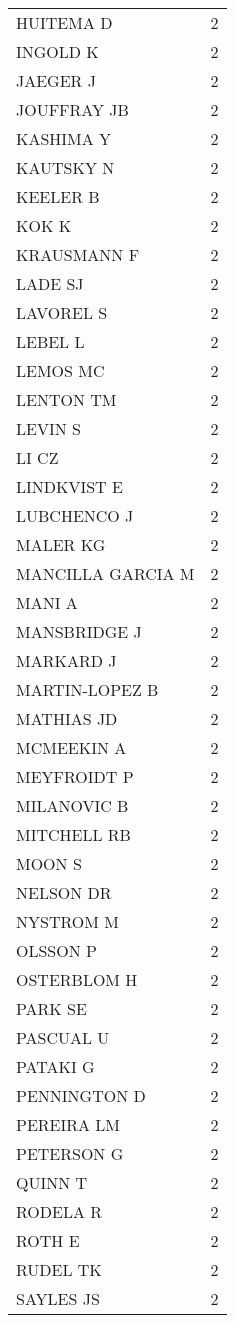 \documentclass[]{article}
\begin{document}
\begin{longtable}{lc}
HUITEMA D & 2 \\ 
INGOLD K & 2 \\ 
JAEGER J & 2 \\ 
JOUFFRAY JB & 2 \\ 
KASHIMA Y & 2 \\ 
KAUTSKY N & 2 \\ 
KEELER B & 2 \\ 
KOK K & 2 \\ 
KRAUSMANN F & 2 \\ 
LADE SJ & 2 \\ 
LAVOREL S & 2 \\ 
LEBEL L & 2 \\ 
LEMOS MC & 2 \\ 
LENTON TM & 2 \\ 
LEVIN S & 2 \\ 
LI CZ & 2 \\ 
LINDKVIST E & 2 \\ 
LUBCHENCO J & 2 \\ 
MALER KG & 2 \\ 
MANCILLA GARCIA M & 2 \\ 
MANI A & 2 \\ 
MANSBRIDGE J & 2 \\ 
MARKARD J & 2 \\ 
MARTIN-LOPEZ B & 2 \\ 
MATHIAS JD & 2 \\ 
MCMEEKIN A & 2 \\ 
MEYFROIDT P & 2 \\ 
MILANOVIC B & 2 \\ 
MITCHELL RB & 2 \\ 
MOON S & 2 \\ 
NELSON DR & 2 \\ 
NYSTROM M & 2 \\ 
OLSSON P & 2 \\ 
OSTERBLOM H & 2 \\ 
PARK SE & 2 \\ 
PASCUAL U & 2 \\ 
PATAKI G & 2 \\ 
PENNINGTON D & 2 \\ 
PEREIRA LM & 2 \\ 
PETERSON G & 2 \\ 
QUINN T & 2 \\ 
RODELA R & 2 \\ 
ROTH E & 2 \\ 
RUDEL TK & 2 \\ 
SAYLES JS & 2 \\ 

\end{longtable}
\end{document}
